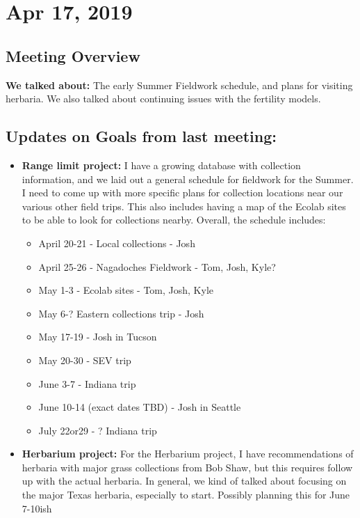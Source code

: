 \documentclass{article}
\begin{document}
  
  
\section*{Apr 17, 2019}
\subsection*{Meeting Overview}
\textbf{We talked about:}
The early Summer Fieldwork schedule, and plans for visiting herbaria. We also talked about continuing issues with the fertility models. 

\subsection*{Updates on Goals from last meeting:}
\begin{itemize}
\item{\textbf{Range limit project:} I have a growing database with collection information, and we laid out a general schedule for fieldwork for the Summer. I need to come up with more specific plans for collection locations near our various other field trips. This also includes having a map of the Ecolab sites to be able to look for collections nearby.
Overall, the schedule includes:
\begin{itemize}
\item{April 20-21 - Local collections  - Josh}
\item{April 25-26 - Nagadoches Fieldwork - Tom, Josh, Kyle?}
\item{May 1-3 - Ecolab sites - Tom, Josh, Kyle}
\item{May 6-? Eastern collections trip - Josh}
\item{May 17-19 - Josh in Tucson}
\item{May 20-30 - SEV trip}
\item{June 3-7 - Indiana trip}
\item{June 10-14 (exact dates TBD) - Josh in Seattle}
\item{July 22or29 - ? Indiana trip}
\end{itemize}
}
\item{\textbf{Herbarium project:} For the Herbarium project, I have recommendations of herbaria with major grass collections from Bob Shaw, but this requires follow up with the actual herbaria. In general, we kind of talked about focusing on the major Texas herbaria, especially to start. Possibly planning this for June 7-10ish}

\end{itemize}
\end{document}
